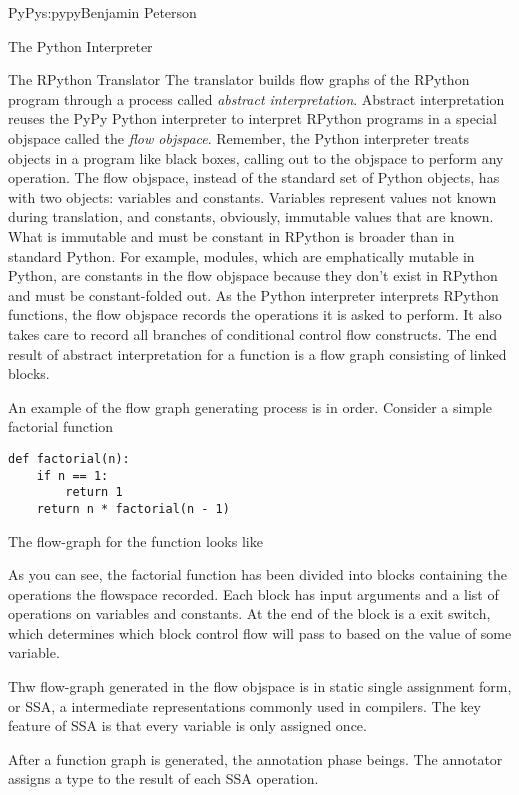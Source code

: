 \begin{aosachapter}{PyPy}{s:pypy}{Benjamin Peterson}
\begin{aosasect1}{The Python Interpreter}
\begin{aosasect1}{The RPython Translator}
The translator builds flow graphs of the RPython program through a process
called \emph{abstract interpretation}. Abstract interpretation reuses the PyPy
Python interpreter to interpret RPython programs in a special objspace called
the \emph{flow objspace}. Remember, the Python interpreter treats objects in a
program like black boxes, calling out to the objspace to perform any
operation. The flow objspace, instead of the standard set of Python objects, has
with two objects: variables and constants. Variables represent values not known
during translation, and constants, obviously, immutable values that are
known. What is immutable and must be constant in RPython is broader than in
standard Python. For example, modules, which are emphatically mutable in Python,
are constants in the flow objspace because they don't exist in RPython and must
be constant-folded out. As the Python interpreter interprets RPython functions,
the flow objspace records the operations it is asked to perform. It also takes
care to record all branches of conditional control flow constructs. The end
result of abstract interpretation for a function is a flow graph consisting of
linked blocks.

An example of the flow graph generating process is in order. Consider a simple
factorial function

\begin{verbatim}
def factorial(n):
    if n == 1:
        return 1
    return n * factorial(n - 1)
\end{verbatim}

The flow-graph for the function looks like 


As you can see, the factorial function has been divided into blocks containing
the operations the flowspace recorded. Each block has input arguments and a list
of operations on variables and constants. At the end of the block is a exit
switch, which determines which block control flow will pass to based on the
value of some variable.

Thw flow-graph generated in the flow objspace is in static single assignment
form, or SSA, a intermediate representations commonly used in compilers. The key
feature of SSA is that every variable is only assigned once.

After a function graph is generated, the annotation phase beings. The annotator
assigns a type to the result of each SSA operation.


\end{aosasect1}
\end{aosasect1}
\end{aosachapter}
